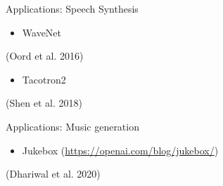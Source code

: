 \begin{frame}{Applications: Speech Synthesis}
\protect\hypertarget{applications-speech-synthesis}{}

\begin{itemize}
\tightlist
\item
  WaveNet
\end{itemize}


(Oord et al. 2016)

\begin{itemize}
\tightlist
\item
  Tacotron2
\end{itemize}


(Shen et al. 2018)

\end{frame}

\begin{frame}{Applications: Music generation}
\protect\hypertarget{applications-music-generation}{}

\begin{itemize}
\tightlist
\item
  Jukebox (\url{https://openai.com/blog/jukebox/})
\end{itemize}


(Dhariwal et al. 2020)

\end{frame}


